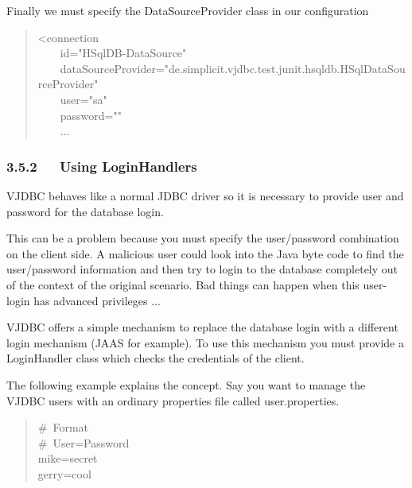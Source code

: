 \documentclass[10pt,a4paper,english]{article}
\begin{document}
Finally we must specify the DataSourceProvider class in our configuration
\begin{quote}{\ttfamily \raggedright \noindent
<connection~\\
~~~~id="HSqlDB-DataSource"~\\
~~~~dataSourceProvider="de.simplicit.vjdbc.test.junit.hsqldb.HSqlDataSourceProvider"~\\
~~~~user="sa"~\\
~~~~password="{}"~\\
~~~~...
}\end{quote}



\hypertarget{using-loginhandlers}{}
\subsubsection*{3.5.2~~~Using LoginHandlers}

VJDBC behaves like a normal JDBC driver so it is necessary to provide user and password for the database login.

This can be a problem because you must specify the user/password combination on the client side. A malicious user could look into the Java byte code to find the user/password information and then try to login to the database completely out of the context of the original scenario. Bad things can happen when this user-login has advanced privileges ...

VJDBC offers a simple mechanism to replace the database login with a different login mechanism (JAAS for example). To use this mechanism you must provide a LoginHandler class which checks the credentials of the client.

The following example explains the concept. Say you want to manage the VJDBC users with an ordinary properties file called user.properties.
\begin{quote}{\ttfamily \raggedright \noindent
{\#}~Format~\\
{\#}~User=Password~\\
mike=secret~\\
gerry=cool
}\end{quote}
\end{document}
